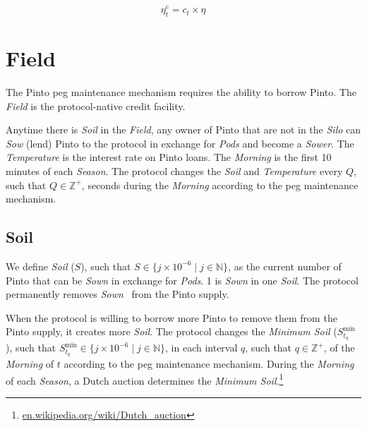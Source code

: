 \documentclass[tikz]{article}
\newcommand{\term}[1]{\textsl{#1}}
\newcommand{\fref}[1]{\footnote{\href{http://#1}{#1}}}
\newcommand{\Pinto}{} %
\newcommand{\pinto}{} %
\begin{document}
    $$
        \eta_{t}^{c} = c_{t}^{\pinto} \times \eta^{\pinto}
    $$


\section{Field}
\vspace{-0.4cm}

The Pinto peg maintenance mechanism requires the ability to borrow Pinto. The \term{Field} is the protocol-native credit facility. 

\vspace{-0.2cm}

Anytime there is \term{Soil} in the \term{Field}, any owner of Pinto that are not in the \term{Silo} can \term{Sow} (lend) Pinto to the protocol in exchange for \term{Pods} and become a \term{Sower}. The \term{Temperature} is the interest rate on Pinto loans. The \term{Morning} is the first 10 minutes of each \term{Season}. The protocol changes the \term{Soil} and \term{Temperature} every $Q$, such that $Q \in \mathbb{Z}^{+}$, seconds during the \term{Morning} according to the peg maintenance mechanism.


\vspace{-0.35cm}
\subsection{Soil}
\vspace{-0.35cm}

We define \term{Soil} ($S$), such that $S \in \{j \times 10^{-6} \mid j \in \mathbb{N} \}$, as the current number of Pinto that can be \term{Sown} in exchange for \term{Pods}. \Pinto1 is \term{Sown} in one \term{Soil}. The protocol permanently removes \term{Sown} \Pinto\ from the Pinto supply. 

\vspace{-0.2cm}

When the protocol is willing to borrow more Pinto to remove them from the Pinto supply, it creates more \term{Soil}. The protocol changes the \term{Minimum Soil} ($S_{t_{q}}^{\text{min}}$), such that $S_{t_{q}}^{\text{min}} \in \{j \times 10^{-6} \mid j \in \mathbb{N} \}$, in each interval $q$, such that $q \in \mathbb{Z}^{+}$, of the \term{Morning} of $t$ according to the peg maintenance mechanism. During the \term{Morning} of each \term{Season}, a Dutch auction determines the \term{Minimum Soil}.\fref{en.wikipedia.org/wiki/Dutch\_auction} 
\end{document}
